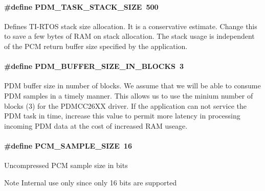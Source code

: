\paragraph[{P\+D\+M\+\_\+\+T\+A\+S\+K\+\_\+\+S\+T\+A\+C\+K\+\_\+\+S\+I\+Z\+E}]{\setlength{\rightskip}{0pt plus 5cm}\#define P\+D\+M\+\_\+\+T\+A\+S\+K\+\_\+\+S\+T\+A\+C\+K\+\_\+\+S\+I\+Z\+E~500}\label{_p_d_m_c_c26_x_x_8h_adc205204f69ea867c95b30efe1530746}
Defines T\+I-\/\+R\+T\+O\+S stack size allocation. It is a conservative estimate. Change this to save a few bytes of R\+A\+M on stack allocation. The stack usage is independent of the P\+C\+M return buffer size specified by the application. 
\paragraph[{P\+D\+M\+\_\+\+B\+U\+F\+F\+E\+R\+\_\+\+S\+I\+Z\+E\+\_\+\+I\+N\+\_\+\+B\+L\+O\+C\+K\+S}]{\setlength{\rightskip}{0pt plus 5cm}\#define P\+D\+M\+\_\+\+B\+U\+F\+F\+E\+R\+\_\+\+S\+I\+Z\+E\+\_\+\+I\+N\+\_\+\+B\+L\+O\+C\+K\+S~3}\label{_p_d_m_c_c26_x_x_8h_ac27121ab901a1442bbebbdac45fce296}
P\+D\+M buffer size in number of blocks. We assume that we will be able to consume P\+D\+M samples in a timely manner. This allows us to use the minium number of blocks (3) for the P\+D\+M\+C\+C26\+X\+X driver. If the application can not service the P\+D\+M task in time, increase this value to permit more latency in processing incoming P\+D\+M data at the cost of increased R\+A\+M useage. 
\paragraph[{P\+C\+M\+\_\+\+S\+A\+M\+P\+L\+E\+\_\+\+S\+I\+Z\+E}]{\setlength{\rightskip}{0pt plus 5cm}\#define P\+C\+M\+\_\+\+S\+A\+M\+P\+L\+E\+\_\+\+S\+I\+Z\+E~16}\label{_p_d_m_c_c26_x_x_8h_a77f1de681b5b50d6e6db60818b5a481d}
Uncompressed P\+C\+M sample size in bits \begin{DoxyNote}{Note}
Internal use only since only 16 bits are supported 
\end{DoxyNote}
